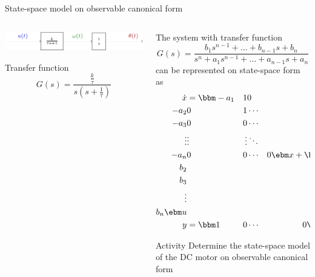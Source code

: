 \documentclass[presentation,aspectratio=169]{beamer}
\begin{document}
\begin{frame}[label={sec:org49ff4e3}]{State-space model on observable canonical form}
\begin{columns}
\begin{column}{0.4\columnwidth}
\begin{center}
  \includegraphics[width=\linewidth]{../../figures/block-DC}
\end{center}

Transfer function
\[G(s) = \frac{ \frac{k}{\tau}} { s(s + \frac{1}{\tau})}\]
\end{column}
\begin{column}{0.6\columnwidth}
The system with transfer function
\begin{equation*}
G(s)=\frac{b_1s^{n-1}+\dots+b_{n-1}s+b_n}{s^n+a_1s^{n-1}+\dots
  +a_{n-1}s+a_n}
\end{equation*}
can be represented on state-space form as
\begin{align*}
\dot{x}&=\bbm -a_1& 1& 0 &\cdots &  0\\
-a_2 & 0& 1 &  \cdots& 0\\
-a_3 & 0 & 0& \cdots & 0\\
\vdots& \vdots& \vdots & \ddots& \vdots\\
-a_n& 0& 0 & \cdots& 0\ebm x+
\bbm b_1\\ b_2\\ b_3\\ \vdots\\ b_n\ebm u\\
y&=\bbm 1& 0& \cdots& 0 \ebm x
\end{align*}

\pause

\alert{Activity} Determine the state-space model of the DC motor on observable canonical form
\end{column}
\end{columns}
\end{frame}
\end{document}
